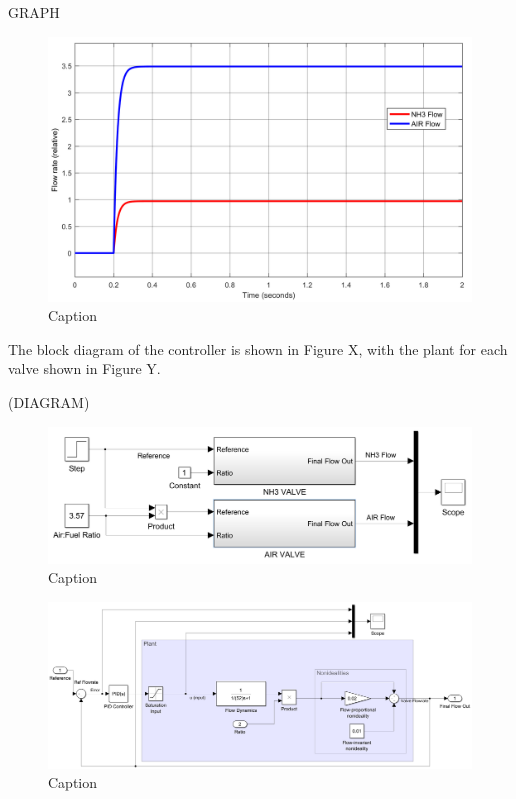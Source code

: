 GRAPH
\begin{figure}[t!]
    \centering
    \includegraphics[scale=0.25]{controllerresponse.png}
    \caption{Caption}
    \label{fig:my_label}
\end{figure}

The block diagram of the controller is shown in Figure X, with the plant for each valve shown in Figure Y.

(DIAGRAM)
\begin{figure}[htb]
    \centering
    \includegraphics[scale=0.23]{controlleroverall.png}
    \caption{Caption}
    \label{fig:my_label}
\end{figure}

\begin{figure}
    \centering
    \includegraphics[scale=0.8]{valvecontroller.png}
    \caption{Caption}
    \label{fig:my_label}
\end{figure}


